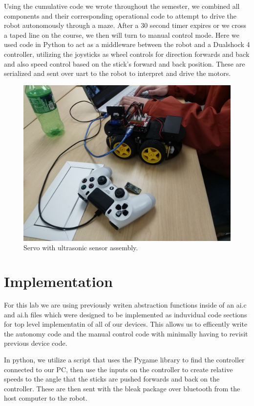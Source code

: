 \documentclass[letterpaper,11pt]{texMemo} %
\begin{document}
Using the cumulative code we wrote throughout the semester, we combined all components and 
their corresponding operational code to attempt to drive the robot autonomously through a maze.
After a 30 second timer expires or we cross a taped line on the course, we then will turn 
to manual control mode. Here we used code in Python to act as a middleware between the robot and 
a Dualshock 4 controller, utilizing the joysticks as wheel controls for direction forwards and back 
and also speed control based on the stick's forward and back position. These are serialized and sent over
uart to the robot to interpret and drive the motors.

\begin{figure}[!ht]
\begin{center}
\includegraphics[width=\linewidth]{robot.jpg}
\end{center}
\caption{Servo with ultrasonic sensor assembly.}
\label{fig:f4}
\end{figure}

\section*{Implementation}
For this lab we are using previously writen abstraction functions inside of an 
ai.c and ai.h files which were designed to be implemented as induvidual code
sections for top level implementatin of all of our devices. This allows us 
to efficently write the autonomy code and the manual control code with minimally
having to revisit previous device code.

In python, we utilize a script that uses the Pygame library to find the controller 
connected to our PC, then use the inputs on the controller to create relative speeds 
to the angle that the sticks are pushed forwards and back on the controller. These 
are then sent with the bleak package over bluetooth from the host computer to the 
robot.
\end{document}
